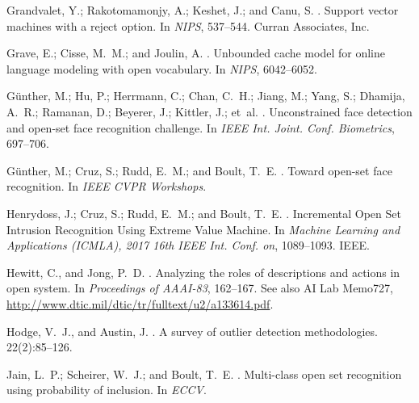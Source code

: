 \documentclass[letterpaper]{article}
\begin{document}
\begin{thebibliography}{}
Grandvalet, Y.; Rakotomamonjy, A.; Keshet, J.; and Canu, S.
.
\newblock Support vector machines with a reject option.
\newblock In {\em NIPS},  537--544.
\newblock Curran Associates, Inc.

Grave, E.; Cisse, M.~M.; and Joulin, A.
.
\newblock Unbounded cache model for online language modeling with open
  vocabulary.
\newblock In {\em NIPS},  6042--6052.

G{\"u}nther, M.; Hu, P.; Herrmann, C.; Chan, C.~H.; Jiang, M.; Yang, S.;
  Dhamija, A.~R.; Ramanan, D.; Beyerer, J.; Kittler, J.; et~al.
.
\newblock Unconstrained face detection and open-set face recognition challenge.
\newblock In {\em IEEE Int. Joint. Conf. Biometrics},  697--706.

Günther, M.; Cruz, S.; Rudd, E.~M.; and Boult, T.~E.
.
\newblock Toward open-set face recognition.
\newblock In {\em IEEE CVPR Workshops}.

Henrydoss, J.; Cruz, S.; Rudd, E.~M.; and Boult, T.~E.
.
\newblock Incremental {Open} {Set} {Intrusion} {Recognition} {Using} {Extreme}
  {Value} {Machine}.
\newblock In {\em Machine {Learning} and {Applications} ({ICMLA}), 2017 16th
  {IEEE} {Int.} {Conf.} on},  1089--1093.
\newblock IEEE.

Hewitt, C., and Jong, P.~D.
.
\newblock Analyzing the roles of descriptions and actions in open system.
\newblock In {\em Proceedings of AAAI-83},  162--167.
\newblock See also AI Lab Memo727,
  \url{http://www.dtic.mil/dtic/tr/fulltext/u2/a133614.pdf}.

Hodge, V.~J., and Austin, J.
.
\newblock A survey of outlier detection methodologies.
 22(2):85--126.

Jain, L.~P.; Scheirer, W.~J.; and Boult, T.~E.
.
\newblock Multi-class open set recognition using probability of inclusion.
\newblock In {\em ECCV}.


\end{thebibliography}
\end{document}

